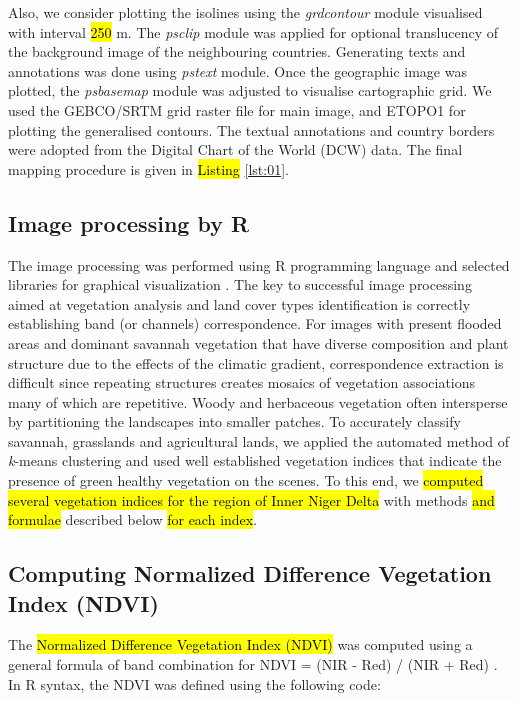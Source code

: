 \documentclass[12pt,a4paper,oneside]{article}
\def \newpar{\vspace{6pt}}
\begin{document}
\newpar Also, we consider plotting the isolines using the \emph{grdcontour} module visualised with interval \hl{250} m. The \emph{psclip} module was applied for optional translucency of the background image of the neighbouring countries. Generating texts and annotations was done using \emph{pstext} module. Once the geographic image was plotted, the \emph{psbasemap} module was adjusted to visualise cartographic grid. We used the GEBCO/SRTM grid raster file for main image, and ETOPO1 for plotting the generalised contours. The textual annotations and country borders were adopted from the Digital Chart of the World (DCW) data. The final mapping procedure is given in \hl{Listing} \ref{lst:01}.

\subsection*{Image processing by R}

\newpar The image processing was performed using R programming language \citep{RCoreTeam} and selected libraries for graphical visualization \citep{Murrell}. The key to successful image processing aimed at vegetation analysis and land cover types identification is correctly establishing band (or channels) correspondence. For images with present flooded areas and dominant savannah vegetation that have diverse composition and plant structure due to the effects of the climatic gradient, correspondence extraction is difficult since repeating structures creates mosaics of vegetation associations many of which are repetitive. Woody and herbaceous vegetation often intersperse by partitioning the landscapes into smaller patches. To accurately classify savannah, grasslands and agricultural lands, we applied the automated method of \emph{k}-means clustering and used well established vegetation indices that indicate the presence of green healthy vegetation on the scenes. To this end, we \hl{computed several vegetation indices for the region of Inner Niger Delta} with methods \hl{and formulae }described below \hl{for each index}. 

\subsection*{Computing Normalized Difference Vegetation Index (NDVI)}

\newpar The \hl{Normalized Difference Vegetation Index (NDVI)} was computed using a general formula of band combination for NDVI = (NIR - Red) / (NIR + Red) \citep{Tarpley}. In R syntax, the NDVI was defined using the following code:
\end{document}
